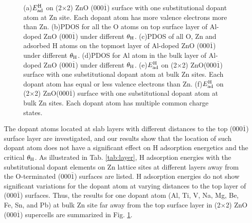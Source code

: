 \begin{figure}[!ht]
  \label{Chap:ZnO_H:fig:dop6}
\caption[H adsorptions on ZnO surfaces with different doping]{(a)$E_{\textup{ad}}^{\textup{H}}$ on (2$\times$2) ZnO (000$\overline{1}$) surface with one substitutional dopant atom at Zn site. Each dopant atom has more valence electrons more than Zn. (b)\ac{PDOS} for all the O atoms on top surface layer of Al-doped ZnO (000$\overline{1}$) under different $\theta_{\textup{H}}$. (c)\ac{PDOS} of all O, Zn and adsorbed H atoms on the topmost layer of Al-doped ZnO (000$\overline{1}$) under different $\theta_{\textup{H}}$. (d)\ac{PDOS} for Al atom in the bulk layer of Al-doped ZnO (000$\overline{1}$) under different $\theta_{\textup{H}}$. (e)$E_{\textup{ad}}^{\textup{H}}$ on (2$\times$2) ZnO(000$\overline{1}$) surface with one substitutional dopant atom at bulk Zn sites. Each dopant atom has equal or less valence electrons than Zn. (f)$E_{\textup{ad}}^{\textup{H}}$ on (2$\times$2) ZnO(000$\overline{1}$) surface with one substitutional dopant atom at bulk Zn sites. Each dopant atom has multiple common charge states.}
\label{Chap:ZnO_H:fig:doped}
\end{figure}
\endgroup

The dopant atoms located at slab layers with different distances to the top (000$\overline{1}$) surface layer are investigated, and our results show that the location of such dopant atom does not have a significant effect on H adsorption energetics and the critical $\theta_{\textup{H}}$. As illustrated in Tab. \ref{tab:layer}, H adsorption energies with the substitutional dopant elements on Zn lattice sites at different layers away from the O-terminated (000$\bar{1}$) surfaces are listed. H adsorption energies do not show significant variations for the dopant atom at varying distances to the top layer of (000$\bar{1}$) surfaces. Thus, the results for one dopant atom (Al, Ti, V, Na, Mg, Be, Fe, Sn, and Pb) at bulk Zn site far away from the top surface layer in (2$\times$2) ZnO (000$\overline{1}$) supercells are summarized in Fig. \ref{Chap:ZnO_H:fig:doped}. 

